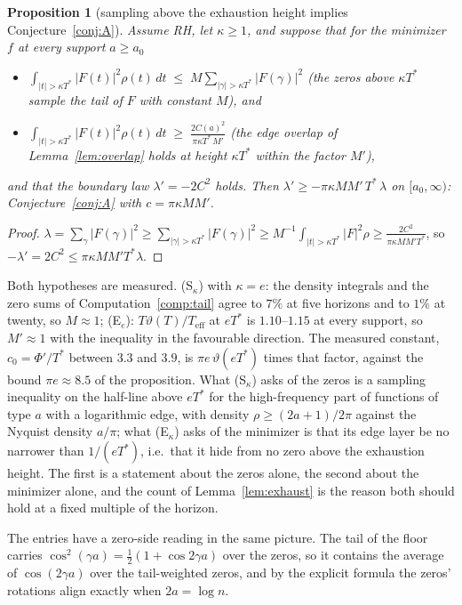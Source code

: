 \documentclass[11pt]{article}
\newtheorem{proposition}[theorem]{Proposition}
\theoremstyle{definition}
\theoremstyle{remark}
\newcommand{\Tst}{T^{*}}
\begin{document}
\begin{proposition}[sampling above the exhaustion height implies Conjecture~\ref{conj:A}]\label{prop:sampling}
Assume RH, let $\kappa\ge1$, and suppose that for the minimizer $f$ at every support $a\ge a_0$
\begin{itemize}
\item[(S$_\kappa$)] $\displaystyle\int_{|t|>\kappa\Tst}|F(t)|^2\rho(t)\,dt\;\le\;M\sum_{|\gamma|>\kappa\Tst}|F(\gamma)|^2$ \quad (the zeros above $\kappa\Tst$ sample the tail of $F$ with constant $M$), and
\item[(E$_\kappa$)] $\displaystyle\int_{|t|>\kappa\Tst}|F(t)|^2\rho(t)\,dt\;\ge\;\frac{2C(a)^2}{\pi\kappa\Tst\,M'}$ \quad (the edge overlap of Lemma~\ref{lem:overlap} holds at height $\kappa\Tst$ within the factor $M'$),
\end{itemize}
and that the boundary law $\lambda'=-2C^2$ holds. Then $\lambda'\ge-\pi\kappa MM'\,\Tst\,\lambda$ on $[a_0,\infty)$: Conjecture~\ref{conj:A} with $c=\pi\kappa MM'$.
\end{proposition}
\begin{proof}
$\lambda=\sum_\gamma|F(\gamma)|^2\ge\sum_{|\gamma|>\kappa\Tst}|F(\gamma)|^2\ge M^{-1}\int_{|t|>\kappa\Tst}|F|^2\rho\ge\frac{2C^2}{\pi\kappa MM'\Tst}$, so $-\lambda'=2C^2\le\pi\kappa MM'\Tst\lambda$.
\end{proof}

Both hypotheses are measured. (S$_\kappa$) with $\kappa=e$: the density integrals and the zero sums of Computation~\ref{comp:tail} agree to $7\%$ at five horizons and to $1\%$ at twenty, so $M\approx1$; (E$_e$): $T\vartheta(T)/T_{\mathrm{eff}}$ at $e\Tst$ is $1.10$--$1.15$ at every support, so $M'\approx1$ with the inequality in the favourable direction. The measured constant, $c_0=\Phi'/\Tst$ between $3.3$ and $3.9$, is $\pi e\,\vartheta(e\Tst)$ times that factor, against the bound $\pi e\approx8.5$ of the proposition. What (S$_\kappa$) asks of the zeros is a sampling inequality on the half-line above $e\Tst$ for the high-frequency part of functions of type $a$ with a logarithmic edge, with density $\rho\ge(2a+1)/2\pi$ against the Nyquist density $a/\pi$; what (E$_\kappa$) asks of the minimizer is that its edge layer be no narrower than $1/(e\Tst)$, i.e.\ that it hide from no zero above the exhaustion height. The first is a statement about the zeros alone, the second about the minimizer alone, and the count of Lemma~\ref{lem:exhaust} is the reason both should hold at a fixed multiple of the horizon.

The entries have a zero-side reading in the same picture. The tail of the floor carries $\cos^2(\gamma a)=\tfrac12(1+\cos2\gamma a)$ over the zeros, so it contains the average of $\cos(2\gamma a)$ over the tail-weighted zeros, and by the explicit formula the zeros' rotations align exactly when $2a=\log n$.
\end{document}
